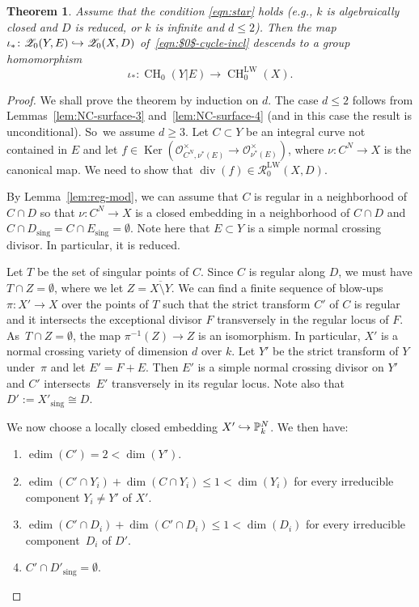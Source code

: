 \documentclass[11pt]{article}
\numberwithin{equation}{section}
\let\mathcal\mathscr
\def\hto{\mathrel{\lhook\joinrel\to}}
\let\inj\hto
\newcommand{\LW}{\mathrm{LW}}
\newtheorem{thm}{Theorem}[section]
\theoremstyle{definition}
\newcommand{\lemref}{Lemma~\ref}
\newcommand{\sO}{{\mathcal O}}\let\cO\sO
\newcommand{\sR}{{\mathcal R}}
\newcommand{\sZ}{{\mathcal Z}}
\renewcommand{\P}{{\mathbb P}}
\DeclareMathOperator{\CH}{CH}
\DeclareMathOperator{\divf}{div}
\DeclareMathOperator{\edim}{edim}
\DeclareMathOperator{\Ker}{Ker}
\newcommand{\sing}{\mathrm{sing}}
\let\ov\overline
\begin{document}
\begin{thm}\label{thm:Reg-mod-LW}
Assume that the condition \eqref{eqn:star} holds
(e.g., $k$ is algebraically closed and
$D$ is reduced, or $k$ is infinite and $d \leq 2$).
Then the map $\iota_* \colon \sZ_0(Y, E) \inj \sZ_0(X, D)$ of~\eqref{eqn:$0$-cycle-incl} descends to a group
homomorphism
\[
\iota_* \colon \CH_0(Y|E) \to \CH^{\LW}_0(X).
\]
\end{thm}
\begin{proof}
We shall prove the theorem by induction on $d$.
The case $d \le 2$ follows from Lemmas~\ref{lem:NC-surface-3} and~\ref{lem:NC-surface-4} (and in this case the result is unconditional).
So~we assume $d \ge 3$.
Let $C \subset Y$ be an integral curve not contained in $E$
and let \hbox{$f \in \Ker(\sO^{\times}_{C^N,\nu^*(E)} \to \sO^{\times}_{\nu^*(E)})$},
where $\nu: C^N \to X$ is the canonical map.
We need to show that $\divf(f) \in \sR^{\LW}_0(X,D)$.

By \lemref{lem:reg-mod}, we can assume that $C$ is regular in a
neighborhood of $C \cap D$ so that $\nu:C^N \to X$ is a closed embedding
in a neighborhood of $C \cap D$ and $C \cap D_{\sing} = C \cap E_{\sing} =
\emptyset$. Note here that $E \subset Y$ is a simple normal crossing divisor.
In particular, it is reduced.

Let $T$ be the set of singular points of $C$. Since $C$ is
regular along $D$, we must have $T \cap Z = \emptyset$,
where we let $Z = \ov{X \setminus Y}$.
We can find a finite sequence of blow-ups $\pi: X' \to X$ over the
points of $T$ such that the strict transform $C'$ of $C$ is regular and
it intersects the exceptional divisor $F$ transversely in the regular locus of
$F$. As~$T \cap Z = \emptyset$, the map $\pi^{-1}(Z) \to Z$ is an isomorphism.
In particular, $X'$ is a normal crossing variety of dimension $d$ over $k$.
Let $Y'$ be the strict transform of $Y$ under~$\pi$
and let $E' = F + E$.
Then $E'$ is a simple normal crossing divisor on $Y'$ and $C'$ intersects~$E'$ transversely in its regular locus.
Note also that $D':= X'_\sing \cong D$.

We now choose a locally closed embedding $X' \inj \P^N_k$.
We then have:
\begin{enumerate}
\item\label{enum:b1}
$\edim(C') = 2 < \dim(Y')$.
\item\label{enum:b2}
$\edim(C' \cap Y_i) + \dim(C \cap Y_i) \le 1 < \dim(Y_i)$ for every irreducible
component $Y_i \neq Y'$ of $X'$.
\item\label{enum:b3}
$\edim(C' \cap D_i) + \dim(C' \cap D_i) \le 1 < \dim(D_i)$ for every irreducible
component~$D_i$ of $D'$.
\item\label{enum:b4}
$C' \cap D'_{\sing} = \emptyset$.
\end{enumerate}


\end{proof}
\end{document}
